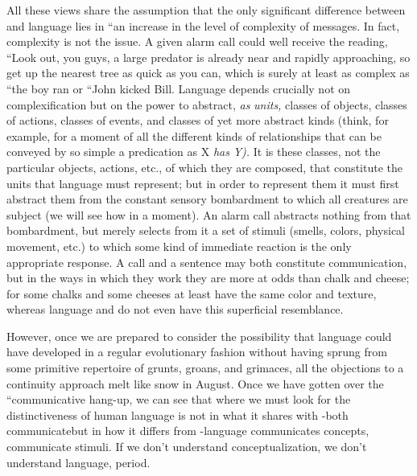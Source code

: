 All these views share the assumption that the only significant difference between  and language lies in ``an increase in the level of complexity of messages. In fact, complexity is not the issue. A given alarm call could well receive the reading, ``Look out, you guys, a large predator is already near and rapidly approaching, so get up the nearest tree as quick as you can, which is surely at least as complex as ``the boy ran or ``John kicked Bill. Language depends crucially not on complexification but on the power to abstract, \textit{as} \textit{units,} classes of objects, classes of actions, classes of events, and classes
of yet more abstract kinds (think, for example, for a moment of all the different kinds of relationships that can be conveyed by so simple a predication as X \textit{has} \textit{Y).} It is these classes, not the particular objects, actions, etc., of which they are composed, that constitute the units that language must represent; but in order to represent them it must first abstract them from the constant sensory bombardment to which all creatures are subject (we will see how in a moment). An alarm call
abstracts nothing from that bombardment, but merely selects from it a set of stimuli (smells, colors, physical movement, etc.) to which some kind of immediate reaction is the only appropriate response. A call and a sentence may both constitute communication, but in the ways in which they work they are more at odds than chalk and cheese; for some chalks and some cheeses at least have the same color and texture, whereas language and  do not even have this superficial resemblance.

However, once we are prepared to consider the possibility that language could have developed in a regular evolutionary fashion with\-out having sprung from some primitive repertoire of grunts, groans, and grimaces, all the objections to a continuity approach melt like snow in August. Once we have gotten over the ``communicative hang-up, we can see that where we must look for the distinctiveness of human language is not in what it shares with -both communicate\-but in how it differs from -language communicates con\-cepts,  communicate stimuli. If we don't understand con\-ceptualization, we don't understand language, period.


